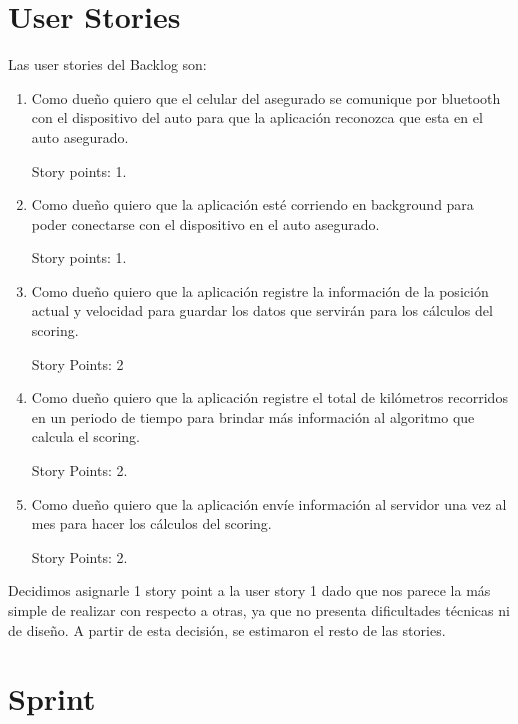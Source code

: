 \section{User Stories}

Las user stories del Backlog son:
\begin{enumerate}
\item Como dueño quiero que el celular del asegurado se comunique por bluetooth con el dispositivo del auto para que la aplicación reconozca que esta en el auto 
asegurado. 

Story points: 1.

\item Como dueño quiero que la aplicación esté corriendo en background para poder conectarse con el dispositivo en el auto asegurado. 

Story points: 
1.

\item Como dueño quiero que la aplicación registre la información de la posición actual y velocidad para guardar los datos que servirán para los cálculos del 
scoring. 

Story Points: 2

\item Como dueño quiero que la aplicación registre el total de kilómetros recorridos en un periodo de tiempo para brindar más información al algoritmo que calcula el 
scoring. 

Story Points: 2.

\item Como dueño quiero que la aplicación envíe información al servidor una vez al mes para hacer los cálculos del scoring. 

Story Points: 2.

\end{enumerate}

Decidimos asignarle 1 story point a la user story 1 dado que nos parece la más simple de realizar con respecto a otras, ya que no presenta dificultades técnicas ni de diseño. A partir de esta decisión, se estimaron el resto de las stories.

\section{Sprint}

